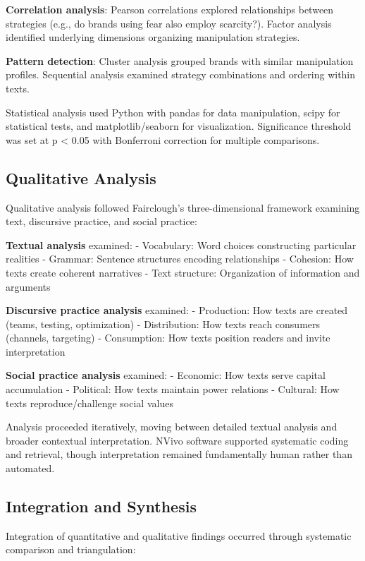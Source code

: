 \textbf{Correlation analysis}: Pearson correlations explored relationships between strategies (e.g., do brands using fear also employ scarcity?). Factor analysis identified underlying dimensions organizing manipulation strategies.

\textbf{Pattern detection}: Cluster analysis grouped brands with similar manipulation profiles. Sequential analysis examined strategy combinations and ordering within texts.

Statistical analysis used Python with pandas for data manipulation, scipy for statistical tests, and matplotlib/seaborn for visualization. Significance threshold was set at p < 0.05 with Bonferroni correction for multiple comparisons.

\subsection{Qualitative Analysis}

Qualitative analysis followed Fairclough's three-dimensional framework examining text, discursive practice, and social practice:

\textbf{Textual analysis} examined:
- Vocabulary: Word choices constructing particular realities
- Grammar: Sentence structures encoding relationships
- Cohesion: How texts create coherent narratives
- Text structure: Organization of information and arguments

\textbf{Discursive practice analysis} examined:
- Production: How texts are created (teams, testing, optimization)
- Distribution: How texts reach consumers (channels, targeting)
- Consumption: How texts position readers and invite interpretation

\textbf{Social practice analysis} examined:
- Economic: How texts serve capital accumulation
- Political: How texts maintain power relations
- Cultural: How texts reproduce/challenge social values

Analysis proceeded iteratively, moving between detailed textual analysis and broader contextual interpretation. NVivo software supported systematic coding and retrieval, though interpretation remained fundamentally human rather than automated.

\subsection{Integration and Synthesis}

Integration of quantitative and qualitative findings occurred through systematic comparison and triangulation:

